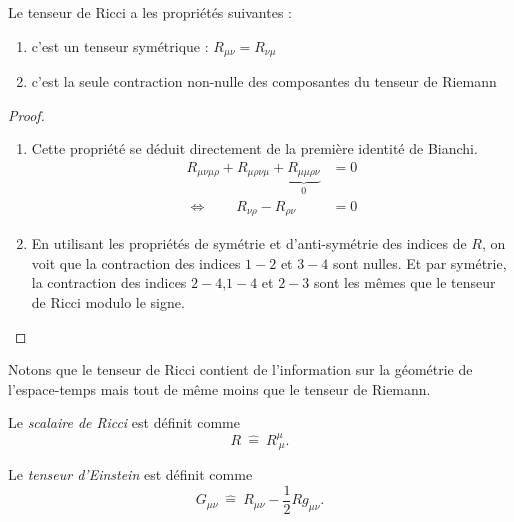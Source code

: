 \documentclass[a4paper,11pt]{report}
\begin{document}
        \begin{prop}\begin{leftbar}
            Le tenseur de Ricci a les propriétés suivantes :
            \begin{enumerate}[label = \textit{\roman*)}]
                \item c'est un tenseur symétrique : $R_{\mu\nu} = R_{\nu\mu}$
                \item c'est la seule contraction non-nulle des composantes du tenseur de Riemann
            \end{enumerate}
        \end{leftbar}\end{prop}
        
        \begin{proof}${}$
            \begin{enumerate}[label = \textit{\roman*)}]
                \item Cette propriété se déduit directement de la première identité de Bianchi.
                \begin{align}
                    R_{\mu\nu\mu\rho}+R_{\mu\rho\nu\mu}+\underbrace{R_{\mu\mu\rho\nu}}_{0} &= 0\\
                    \Leftrightarrow\qquad R_{\nu\rho} - R_{\rho\nu} &= 0
                \end{align}
                \item En utilisant les propriétés de symétrie et d'anti-symétrie des indices de $R$, on voit que la contraction des indices $1-2$ et $3-4$ sont nulles. Et par symétrie, la contraction des indices $2-4$,$1-4$ et $2-3$ sont les mêmes que le tenseur de Ricci modulo le signe.
            \end{enumerate}
        \end{proof}
        
        Notons que le tenseur de Ricci contient de l'information sur la géométrie de l'espace-temps mais tout de même moins que le tenseur de Riemann.
        
         \begin{definition}
            Le \textit{scalaire de Ricci} est définit comme
            \begin{equation}
                R ~\hat{=}~ R^\mu_{~\mu}.
            \end{equation}
        \end{definition}
        
        \begin{definition}
            Le \textit{tenseur d'Einstein} est définit comme
            \begin{equation}
                G_{\mu\nu} ~\hat{=}~ R_{\mu\nu}-\frac{1}{2}Rg_{\mu\nu}.
            \end{equation}
        \end{definition}
        
\end{document}
